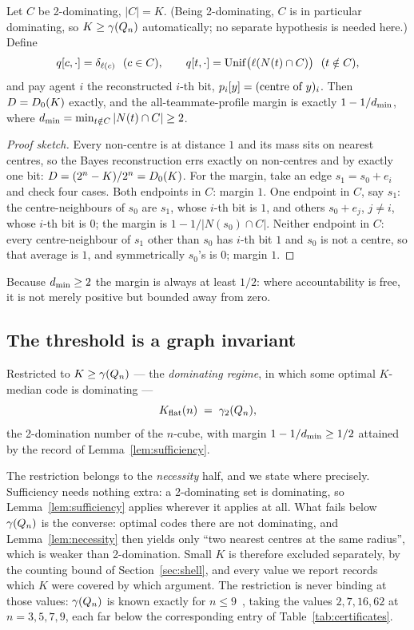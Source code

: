 \begin{lemma}[Sufficiency]
\label{lem:sufficiency}
Let $C$ be 2-dominating, $|C| = K$. (Being 2-dominating, $C$ is in particular
dominating, so $K \ge \gamma(Q_n)$ automatically; no separate hypothesis is
needed here.) Define
\[
  q[c,\cdot] = \delta_{\ell(c)} \ \ (c \in C), \qquad
  q[t,\cdot] = \mathrm{Unif}\bigl(\ell(N(t) \cap C)\bigr) \ \ (t \notin C),
\]
and pay agent $i$ the reconstructed $i$-th bit, $p_i[y] = (\text{centre of } y)_i$.
Then $D = D_0(K)$ exactly, and the all-teammate-profile margin is exactly
$1 - 1/d_{\min}$, where $d_{\min} = \min_{t \notin C}|N(t)\cap C| \ge 2$.
\end{lemma}

\begin{proof}[Proof sketch]
Every non-centre is at distance $1$ and its mass sits on nearest centres, so the
Bayes reconstruction errs exactly on non-centres and by exactly one bit:
$D = (2^n - K)/2^n = D_0(K)$. For the margin, take an edge
$s_1 = s_0 + e_i$ and check four cases. Both endpoints in $C$: margin $1$. One
endpoint in $C$, say $s_1$: the centre-neighbours of $s_0$ are $s_1$, whose
$i$-th bit is $1$, and others $s_0 + e_j$, $j \ne i$, whose $i$-th bit is $0$;
the margin is $1 - 1/|N(s_0)\cap C|$. Neither endpoint in $C$: every
centre-neighbour of $s_1$ other than $s_0$ has $i$-th bit $1$ and $s_0$ is not a
centre, so that average is $1$, and symmetrically $s_0$'s is $0$; margin $1$.
\end{proof}

Because $d_{\min} \ge 2$ the margin is always at least $1/2$: where accountability
is free, it is not merely positive but bounded away from zero.

\subsection{The threshold is a graph invariant}

\begin{theorem}
\label{thm:kflat}
Restricted to $K \ge \gamma(Q_n)$ --- the \emph{dominating regime}, in which some
optimal $K$-median code is dominating ---
\[
  K_{\mathrm{flat}}(n) \;=\; \gamma_2(Q_n),
\]
the 2-domination number of the $n$-cube, with margin $1 - 1/d_{\min} \ge 1/2$
attained by the record of Lemma~\ref{lem:sufficiency}.
\end{theorem}

The restriction belongs to the \emph{necessity} half, and we state where
precisely. Sufficiency needs nothing extra: a 2-dominating set is dominating, so
Lemma~\ref{lem:sufficiency} applies wherever it applies at all. What fails below
$\gamma(Q_n)$ is the converse: optimal codes there are not dominating, and
Lemma~\ref{lem:necessity} then yields only ``two nearest centres at the same
radius'', which is weaker than 2-domination. Small $K$ is therefore excluded
separately, by the counting bound of Section~\ref{sec:shell}, and every value we
report records which $K$ were covered by which argument. The restriction is never
binding at those values: $\gamma(Q_n)$ is known exactly for
$n \le 9$~\cite{ostergardblass2001}, taking the values $2, 7, 16, 62$ at
$n = 3,5,7,9$, each far below the corresponding entry of
Table~\ref{tab:certificates}.

